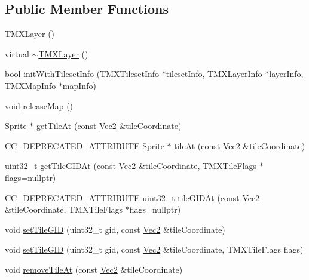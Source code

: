 \subsection*{Public Member Functions}
\begin{DoxyCompactItemize}
\item 
\hyperlink{classTMXLayer_a24b45a43f69749ee9c63e94eb0bcad96}{T\+M\+X\+Layer} ()
\item 
virtual \hyperlink{classTMXLayer_a488ce77caa72fc4ca28db81b7393c670}{$\sim$\+T\+M\+X\+Layer} ()
\item 
bool \hyperlink{classTMXLayer_abc5373b13dff0e9f01697f46783eaff8}{init\+With\+Tileset\+Info} (T\+M\+X\+Tileset\+Info $\ast$tileset\+Info, T\+M\+X\+Layer\+Info $\ast$layer\+Info, T\+M\+X\+Map\+Info $\ast$map\+Info)
\item 
void \hyperlink{classTMXLayer_a45ad4c67a9ea4e2f2ce3d6d6228e5402}{release\+Map} ()
\item 
\hyperlink{classSprite}{Sprite} $\ast$ \hyperlink{classTMXLayer_a3766adcc9f0d3619c97620b7e1cf04dc}{get\+Tile\+At} (const \hyperlink{classVec2}{Vec2} \&tile\+Coordinate)
\item 
C\+C\+\_\+\+D\+E\+P\+R\+E\+C\+A\+T\+E\+D\+\_\+\+A\+T\+T\+R\+I\+B\+U\+TE \hyperlink{classSprite}{Sprite} $\ast$ \hyperlink{classTMXLayer_a2258360648a3e91a3dccb4f52ffad8f1}{tile\+At} (const \hyperlink{classVec2}{Vec2} \&tile\+Coordinate)
\item 
uint32\+\_\+t \hyperlink{classTMXLayer_a0a3f3e283a4a654aae4e4e4761e386eb}{get\+Tile\+G\+I\+D\+At} (const \hyperlink{classVec2}{Vec2} \&tile\+Coordinate, T\+M\+X\+Tile\+Flags $\ast$flags=nullptr)
\item 
C\+C\+\_\+\+D\+E\+P\+R\+E\+C\+A\+T\+E\+D\+\_\+\+A\+T\+T\+R\+I\+B\+U\+TE uint32\+\_\+t \hyperlink{classTMXLayer_a244f8bff6274b630488bf6ebebdeee5a}{tile\+G\+I\+D\+At} (const \hyperlink{classVec2}{Vec2} \&tile\+Coordinate, T\+M\+X\+Tile\+Flags $\ast$flags=nullptr)
\item 
void \hyperlink{classTMXLayer_a6da5cb4f6fa4c0f1853f5030323dd759}{set\+Tile\+G\+ID} (uint32\+\_\+t gid, const \hyperlink{classVec2}{Vec2} \&tile\+Coordinate)
\item 
void \hyperlink{classTMXLayer_adfb01865934be28adc5f1b38876c7c4e}{set\+Tile\+G\+ID} (uint32\+\_\+t gid, const \hyperlink{classVec2}{Vec2} \&tile\+Coordinate, T\+M\+X\+Tile\+Flags flags)
\item 
void \hyperlink{classTMXLayer_a185ae1ff2a7ce7069e67362fb1faa930}{remove\+Tile\+At} (const \hyperlink{classVec2}{Vec2} \&tile\+Coordinate)
\item 

\end{DoxyCompactItemize}

